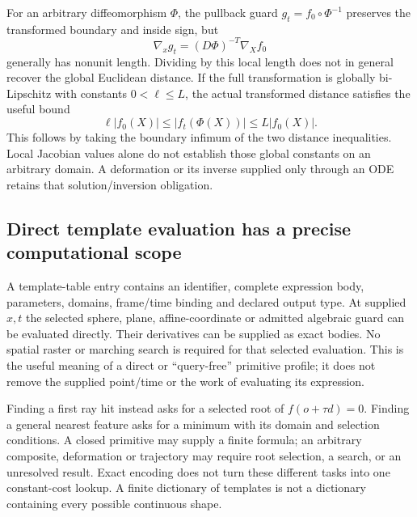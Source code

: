 For an arbitrary diffeomorphism $\Phi$, the pullback guard
$g_t=f_0\circ\Phi^{-1}$ preserves the transformed boundary and inside sign,
but
\begin{equation}
 \nabla_x g_t=(D\Phi)^{-T}\nabla_X f_0
 \label{eq:r15-deformed-normal}
\end{equation}
generally has nonunit length. Dividing by this local length does not in
general recover the global Euclidean distance. If the full transformation is
globally bi-Lipschitz with constants $0<\ell\le L$, the actual transformed
distance satisfies the useful bound
\begin{equation}
 \ell|f_0(X)|\le |f_t(\Phi(X))|\le L|f_0(X)|.
 \label{eq:r15-deformed-bound}
\end{equation}
This follows by taking the boundary infimum of the two distance inequalities.
Local Jacobian values alone do not establish those global constants on an
arbitrary domain. A deformation or its inverse supplied only through an ODE
retains that solution/inversion obligation.

\subsection{Direct template evaluation has a precise computational scope}
A template-table entry contains an identifier, complete expression body,
parameters, domains, frame/time binding and declared output type. At supplied
$x,t$ the selected sphere, plane, affine-coordinate or admitted algebraic
guard can be evaluated directly. Their derivatives can be supplied as exact
bodies. No spatial raster or marching search is required for that selected
evaluation. This is the useful meaning of a direct or ``query-free'' primitive
profile; it does not remove the supplied point/time or the work of evaluating
its expression.

Finding a first ray hit instead asks for a selected root of
$f(o+\tau d)=0$. Finding a general nearest feature asks for a minimum with its
domain and selection conditions. A closed primitive may supply a finite
formula; an arbitrary composite, deformation or trajectory may require root
selection, a search, or an unresolved result. Exact encoding does not turn
these different tasks into one constant-cost lookup. A finite dictionary of
templates is not a dictionary containing every possible continuous shape.

